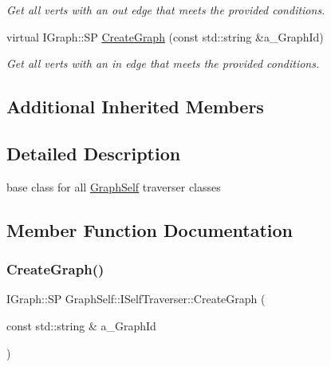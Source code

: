 \begin{DoxyCompactItemize}
\begin{DoxyCompactList}\small\item\em Get all verts with an out edge that meets the provided conditions. \end{DoxyCompactList}\item 
virtual I\+Graph\+::\+SP \hyperlink{class_graph_self_1_1_i_self_traverser_adf9a16dd7596a980483af356e4439724}{Create\+Graph} (const std\+::string \&a\+\_\+\+Graph\+Id)
\begin{DoxyCompactList}\small\item\em Get all verts with an in edge that meets the provided conditions. \end{DoxyCompactList}\end{DoxyCompactItemize}
\subsection*{Additional Inherited Members}


\subsection{Detailed Description}
base class for all \hyperlink{class_graph_self}{Graph\+Self} traverser classes 

\subsection{Member Function Documentation}
\mbox{\label{class_graph_self_1_1_i_self_traverser_adf9a16dd7596a980483af356e4439724}} 
\subsubsection{\texorpdfstring{Create\+Graph()}{CreateGraph()}}
{\footnotesize\ttfamily I\+Graph\+::\+SP Graph\+Self\+::\+I\+Self\+Traverser\+::\+Create\+Graph (\begin{DoxyParamCaption}\item[{const std\+::string \&}]{a\+\_\+\+Graph\+Id }\end{DoxyParamCaption})\hspace{0.3cm}{\ttfamily [virtual]}}




